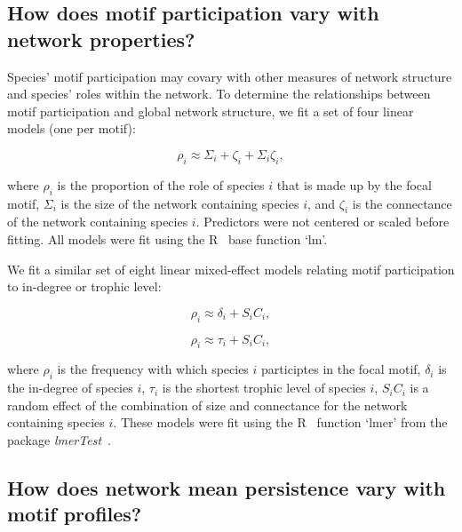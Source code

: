 \documentclass[12pt]{article}
\begin{document}
\begin{spacing}{2.0}
    \subsection{How does motif participation vary with network properties?}

        Species' motif participation may covary with other measures of network structure and species' roles within the network.
        To determine the relationships between motif participation and global network structure, we fit a set of four linear models (one per motif):

        \begin{equation}
            \rho_{i} \approx \Sigma_{i} + \zeta_{i} + \Sigma_{i}\zeta_{i} ,
            \label{partic_SC}
        \end{equation}
        
        where $\rho_{i}$ is the proportion of the role of species $i$ that is made up by the focal motif,
        $\Sigma_{i}$ is the size of the network containing species $i$, and $\zeta_{i}$ is the connectance of the network containing species $i$.
        Predictors were not centered or scaled before fitting.
        All models were fit using the R~\citep{R} base function `lm'.

       
        We fit a similar set of eight linear mixed-effect models relating motif participation to in-degree or trophic level:
        
        \begin{equation}
            \rho_{i} \approx \delta_{i} + S_{i}C_{i} ,
            \label{partic_deg}
        \end{equation}

        \begin{equation}
            \rho_{i} \approx \tau_{i} + S_{i}C_{i} ,
            \label{partic_deg}
        \end{equation}
        
        where $\rho_{i}$ is the frequency with which species $i$ participtes in the focal motif, $\delta_{i}$ is the in-degree of species $i$, $\tau_{i}$ is the shortest trophic level of species $i$, $S_{i}C_{i}$ is a random effect of the combination of size and connectance for the network containing species $i$.
        These models were fit using the R~\citep{R} function `lmer' from the package \emph{lmerTest}~\citep{lmerTest}.

    		
    \subsection{How does network mean persistence vary with motif profiles?}


\end{spacing}
\end{document}
